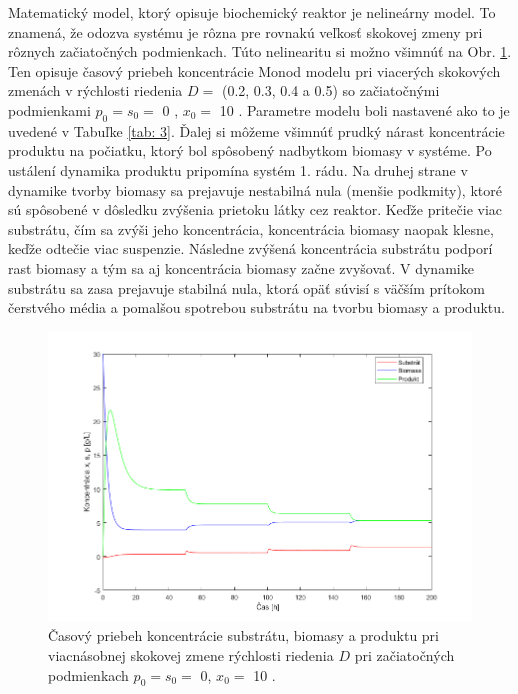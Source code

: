 Matematický model, ktorý opisuje biochemický reaktor je nelineárny model. To znamená, že odozva systému je rôzna pre rovnakú veľkosť skokovej zmeny pri rôznych začiatočných podmienkach. Túto nelinearitu si možno všimnúť na Obr. \ref{fig:1}. Ten opisuje časový priebeh koncentrácie Monod modelu pri viacerých skokových zmenách v rýchlosti riedenia $D = $ (0.2, 0.3, 0.4 a 0.5) so začiatočnými podmienkami $p_0 = s_0 = $ 0 , $x_0 = $ 10 . Parametre modelu boli nastavené ako to je uvedené v Tabuľke \ref{tab: 3}. Ďalej si môžeme všimnúť prudký nárast koncentrácie produktu na počiatku, ktorý bol spôsobený nadbytkom biomasy v systéme. Po ustálení dynamika produktu pripomína systém 1. rádu. Na druhej strane v dynamike tvorby biomasy sa prejavuje nestabilná nula (menšie podkmity), ktoré sú spôsobené v dôsledku zvýšenia prietoku látky cez reaktor. Keďže pritečie viac substrátu, čím sa zvýši jeho koncentrácia, koncentrácia biomasy naopak klesne, keďže odtečie viac suspenzie. Následne zvýšená koncentrácia substrátu podporí rast biomasy a tým sa aj koncentrácia biomasy začne zvyšovať. V dynamike substrátu sa zasa prejavuje stabilná nula, ktorá opäť súvisí s väčším prítokom čerstvého média a pomalšou spotrebou substrátu na tvorbu biomasy a produktu.

\begin{figure}
	\centering
	\includegraphics[width=.7\linewidth]{images/step_change}
	\caption[]{Časový priebeh koncentrácie substrátu, biomasy a produktu pri viacnásobnej skokovej zmene rýchlosti riedenia $D$ pri začiatočných podmienkach $p_0 = s_0 = $ 0, $x_0 = $ 10 .}
	\label{fig:1}
\end{figure}


